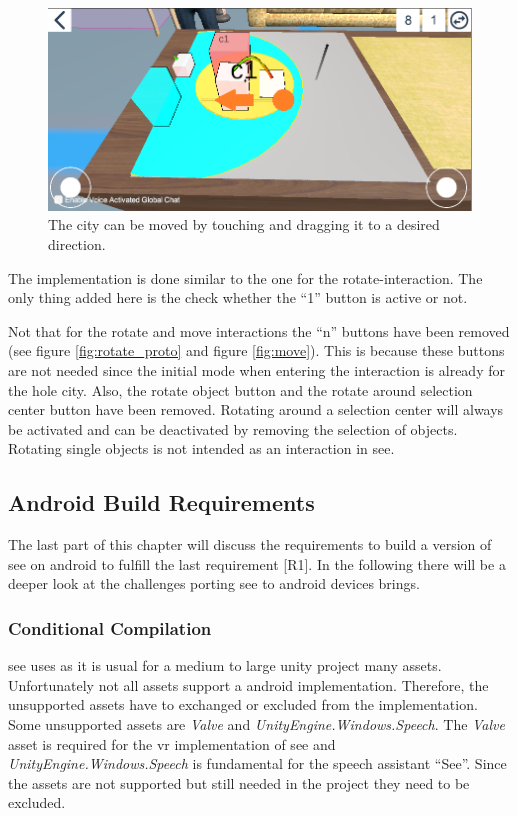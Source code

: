 \begin{figure}[htb]
    \centering
    \includegraphics[width=1\textwidth]{Implementation/img/move.png}
    \caption{The \gls{city} can be moved by touching and dragging it to a desired direction.}\label{fig:left}
\end{figure}

The implementation is done similar to the one for the rotate-interaction. 
The only thing added here is the check whether the \enquote{1} button is active or not.

Not that for the rotate and move interactions the \enquote{n} buttons have been removed (see figure \ref{fig:rotate_proto} and figure \ref{fig:move}).
This is because these buttons are not needed since the initial mode when entering the interaction is already for the hole \gls{city}.
Also, the rotate object button and the rotate around selection center button have been removed. 
Rotating around a selection center will always be activated and can be deactivated by removing the selection of objects.
Rotating single objects is not intended as an interaction in \gls{see}.

\subsection{Android Build Requirements}
The last part of this chapter will discuss the requirements to build a version of \gls{see} on \gls{android} to fulfill the last requirement [R1].
In the following there will be a deeper look at the challenges porting \gls{see} to android devices brings. 


\subsubsection{Conditional Compilation}

\gls{see} uses as it is usual for a medium to large \gls{unity} project many \glspl{asset}.
Unfortunately not all \glspl{asset} support a \gls{android} implementation.
Therefore, the unsupported assets have to exchanged or excluded from the implementation.
Some unsupported \glspl{asset} are \textit{Valve} and \textit{UnityEngine.Windows.Speech}.
The \textit{Valve} \gls{asset} is required for the \gls{vr} implementation of \gls{see} and \textit{UnityEngine.Windows.Speech} is fundamental for the speech assistant \enquote{See}.
Since the \glspl{asset} are not supported but still needed in the project they need to be excluded. 

